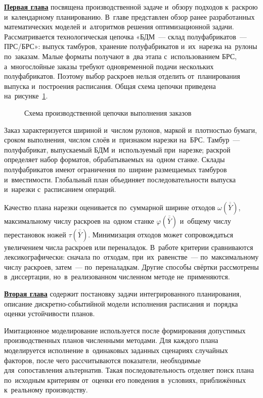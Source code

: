 \underline{\textbf{Первая глава}} посвящена производственной задаче и~обзору подходов к~раскрою и~календарному планированию. В~главе представлен обзор ранее разработанных математических моделей и~алгоритмов решения оптимизационной задачи. Рассматривается технологическая цепочка «БДМ~--- склад полуфабрикатов~--- ПРС/БРС»: выпуск тамбуров, хранение полуфабрикатов и~их~нарезка на~рулоны по~заказам. Малые форматы получают в~два этапа с~использованием БРС, а~многослойные заказы требуют одновременной подачи нескольких полуфабрикатов. Поэтому выбор раскроев нельзя отделить от~планирования выпуска и~построения расписания. Общая схема цепочки приведена на~рисунке~\ref{fig:synopsis-production-chain}.

\begin{figure}
    \centering
    \resizebox{\textwidth}{!}{%
    }
    \caption{Схема производственной цепочки выполнения заказов}
    \label{fig:synopsis-production-chain}
\end{figure}

Заказ характеризуется шириной и~числом рулонов, маркой и~плотностью бумаги, сроком выполнения, числом слоёв и~признаком нарезки на~БРС. Тамбур~--- полуфабрикат, выпускаемый БДМ и~используемый при~нарезке; раскрой определяет набор форматов, обрабатываемых на~одном станке. Склады полуфабрикатов имеют ограничения по~ширине размещаемых тамбуров и~вместимости. Глобальный план объединяет последовательности выпуска и~нарезки с~расписанием операций.

Качество плана нарезки оценивается по~суммарной ширине отходов $\omega(\overline{\overline{Y}})$, максимальному числу раскроев на~одном станке $\varphi(\overline{\overline{Y}})$ и~общему числу перестановок ножей $\tau(\overline{\overline{Y}})$. Минимизация отходов может сопровождаться увеличением числа раскроев или переналадок. В~работе критерии сравниваются лексикографически: сначала по~отходам, при~их~равенстве~--- по~максимальному числу раскроев, затем~--- по~переналадкам. Другие способы свёртки рассмотрены в~диссертации, но~в~реализованном численном методе не~применяются.

\underline{\textbf{Вторая глава}} содержит постановку задачи интегрированного планирования, описание дискретно-событийной модели исполнения расписания и~порядка оценки устойчивости планов.

Имитационное моделирование используется после формирования допустимых производственных планов численными методами. Для каждого плана моделируется исполнение в~одинаковых заданных сценариях случайных факторов, после чего рассчитываются показатели, необходимые для~сопоставления альтернатив. Такая последовательность отделяет поиск плана по~исходным критериям от~оценки его поведения в~условиях, приближённых к~реальному производству.

